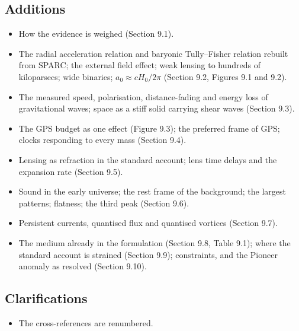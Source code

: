 \subsection*{Additions}
\begin{itemize}
\item How the evidence is weighed (Section 9.1).
\item The radial acceleration relation and baryonic Tully--Fisher relation rebuilt from SPARC; the external field effect; weak lensing to hundreds of kiloparsecs; wide binaries; $a_0 \approx cH_0/2\pi$ (Section 9.2, Figures 9.1 and 9.2).
\item The measured speed, polarisation, distance-fading and energy loss of gravitational waves; space as a stiff solid carrying shear waves (Section 9.3).
\item The GPS budget as one effect (Figure 9.3); the preferred frame of GPS; clocks responding to every mass (Section 9.4).
\item Lensing as refraction in the standard account; lens time delays and the expansion rate (Section 9.5).
\item Sound in the early universe; the rest frame of the background; the largest patterns; flatness; the third peak (Section 9.6).
\item Persistent currents, quantised flux and quantised vortices (Section 9.7).
\item The medium already in the formulation (Section 9.8, Table 9.1); where the standard account is strained (Section 9.9); constraints, and the Pioneer anomaly as resolved (Section 9.10).
\end{itemize}

\subsection*{Clarifications}
\begin{itemize}
\item The cross-references are renumbered.
\end{itemize}



